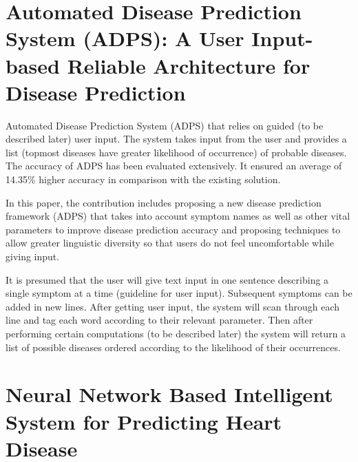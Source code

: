 \section{Automated Disease Prediction System (ADPS): A User Input-based Reliable Architecture for Disease Prediction}
Automated  Disease  Prediction System  (ADPS)  that  relies  on guided  (to be  described later)  user input.  The system  takes input from the user and provides a list (topmost diseases have greater  likelihood  of occurrence)  of  probable  diseases.  The accuracy of ADPS has been evaluated extensively. It ensured an average of 14.35\% higher accuracy in comparison with the existing solution. \par
In  this  paper,  the  contribution  includes  proposing  a  new disease prediction framework (ADPS) that takes into account symptom  names  as  well  as  other  vital  parameters to improve disease prediction accuracy and  proposing  techniques  to allow  greater  linguistic  diversity  so  that  users  do  not  feel uncomfortable while giving input. \par
It is presumed that the user will give text input in one sentence describing  a  single  symptom  at  a  time  (guideline  for  user input). Subsequent symptoms can be added in new lines. After getting user input, the system will scan through each line and tag  each  word  according  to  their relevant  parameter.  Then after performing certain computations (to be described later) the  system  will  return  a  list  of  possible  diseases  ordered according to the likelihood of their occurrences.

\section{Neural Network Based Intelligent System for Predicting Heart Disease}


